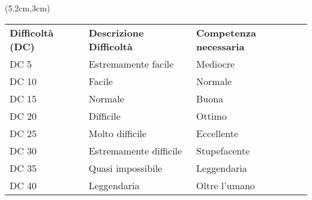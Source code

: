 \documentclass[a4paper,12 pt,openany]{book}
\begin{document}
	\begin{textblock*}{15cm}(5.2cm,3cm) %
		\footnotesize
		\begin{tabular}{lll}
			\textbf{Difficoltà (DC)} & \textbf{Descrizione Difficoltà} & \textbf{ Competenza necessaria} \\
			DC 5                      & Estremamente facile              & Mediocre                        \\
			DC 10                     & Facile                           & Normale                         \\
			DC 15                     & Normale                          & Buona                           \\
			DC 20                     & Difficile                        & Ottimo                          \\
			DC 25                     & Molto difficile                  & Eccellente                      \\
			DC 30                     & Estremamente difficile           & Stupefacente                    \\
			DC 35                     & Quasi impossibile                & Leggendaria                     \\
			DC 40                     & Leggendaria                      & Oltre l'umano                   \\
		\end{tabular}
	\end{textblock*}
\end{document}
